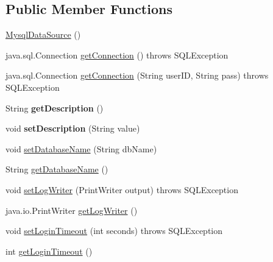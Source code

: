 \subsection*{Public Member Functions}
\begin{DoxyCompactItemize}
\item 
\mbox{\hyperlink{classcom_1_1mysql_1_1cj_1_1jdbc_1_1_mysql_data_source_a693d45a73e9e843ae443fb8d6489f50d}{Mysql\+Data\+Source}} ()
\item 
java.\+sql.\+Connection \mbox{\hyperlink{classcom_1_1mysql_1_1cj_1_1jdbc_1_1_mysql_data_source_a585676b84163ab8ebd4ed84af71a80ea}{get\+Connection}} ()  throws S\+Q\+L\+Exception 
\item 
java.\+sql.\+Connection \mbox{\hyperlink{classcom_1_1mysql_1_1cj_1_1jdbc_1_1_mysql_data_source_ae210ba178fafb65d2f2b57ff6697ae60}{get\+Connection}} (String user\+ID, String pass)  throws S\+Q\+L\+Exception 
\item 
\mbox{\label{classcom_1_1mysql_1_1cj_1_1jdbc_1_1_mysql_data_source_a4d031bf01ec1b2c61692181f42025a89}} 
String {\bfseries get\+Description} ()
\item 
\mbox{\label{classcom_1_1mysql_1_1cj_1_1jdbc_1_1_mysql_data_source_a953b80b5083953434de23b4b7853d684}} 
void {\bfseries set\+Description} (String value)
\item 
void \mbox{\hyperlink{classcom_1_1mysql_1_1cj_1_1jdbc_1_1_mysql_data_source_a61c38c590ddffdefc2eca544a68beb09}{set\+Database\+Name}} (String db\+Name)
\item 
String \mbox{\hyperlink{classcom_1_1mysql_1_1cj_1_1jdbc_1_1_mysql_data_source_a8a77d80a5db8b80a2957cd3b23121e57}{get\+Database\+Name}} ()
\item 
void \mbox{\hyperlink{classcom_1_1mysql_1_1cj_1_1jdbc_1_1_mysql_data_source_a53de4e7ee2a4cffff97cf0432b395fcc}{set\+Log\+Writer}} (Print\+Writer output)  throws S\+Q\+L\+Exception 
\item 
java.\+io.\+Print\+Writer \mbox{\hyperlink{classcom_1_1mysql_1_1cj_1_1jdbc_1_1_mysql_data_source_a89b785e08483618bd420c334652905e6}{get\+Log\+Writer}} ()
\item 
void \mbox{\hyperlink{classcom_1_1mysql_1_1cj_1_1jdbc_1_1_mysql_data_source_abe43a309548e80bb5ecac98c9360a9c3}{set\+Login\+Timeout}} (int seconds)  throws S\+Q\+L\+Exception 
\item 
int \mbox{\hyperlink{classcom_1_1mysql_1_1cj_1_1jdbc_1_1_mysql_data_source_afa817e73b6270e9dd2777fa39328bb82}{get\+Login\+Timeout}} ()

\end{DoxyCompactItemize}

